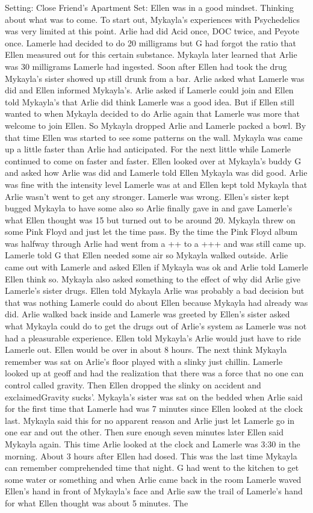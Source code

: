 \documentclass[12pt]{book}
\begin{document}
Setting: Close Friend's Apartment Set: Ellen was in a good mindset. Thinking about what was to come. To start out, Mykayla's experiences with Psychedelics was very limited at this point. Arlie had did Acid once, DOC twice, and Peyote once. Lamerle had decided to do 20 milligrams but G had forgot the ratio that Ellen measured out for this certain substance. Mykayla later learned that Arlie was 30 milligrams Lamerle had ingested. Soon after Ellen had took the drug Mykayla's sister showed up still drunk from a bar. Arlie asked what Lamerle was did and Ellen informed Mykayla's. Arlie asked if Lamerle could join and Ellen told Mykayla's that Arlie did think Lamerle was a good idea. But if Ellen still wanted to when Mykayla decided to do Arlie again that Lamerle was more that welcome to join Ellen. So Mykayla dropped Arlie and Lamerle packed a bowl. By that time Ellen was started to see some patterns on the wall. Mykayla was came up a little faster than Arlie had anticipated. For the next little while Lamerle continued to come on faster and faster. Ellen looked over at Mykayla's buddy G and asked how Arlie was did and Lamerle told Ellen Mykayla was did good. Arlie was fine with the intensity level Lamerle was at and Ellen kept told Mykayla that Arlie wasn't went to get any stronger. Lamerle was wrong. Ellen's sister kept bugged Mykayla to have some also so Arlie finally gave in and gave Lamerle's what Ellen thought was 15 but turned out to be around 20. Mykayla threw on some Pink Floyd and just let the time pass. By the time the Pink Floyd album was halfway through Arlie had went from a ++ to a +++ and was still came up. Lamerle told G that Ellen needed some air so Mykayla walked outside. Arlie came out with Lamerle and asked Ellen if Mykayla was ok and Arlie told Lamerle Ellen think so. Mykayla also asked something to the effect of why did Arlie give Lamerle's sister drugs. Ellen told Mykayla Arlie was probably a bad decision but that was nothing Lamerle could do about Ellen because Mykayla had already was did. Arlie walked back inside and Lamerle was greeted by Ellen's sister asked what Mykayla could do to get the drugs out of Arlie's system as Lamerle was not had a pleasurable experience. Ellen told Mykayla's Arlie would just have to ride Lamerle out. Ellen would be over in about 8 hours. The next think Mykayla remember was sat on Arlie's floor played with a slinky just chillin. Lamerle looked up at geoff and had the realization that there was a force that no one can control called gravity. Then Ellen dropped the slinky on accident and exclaimedGravity sucks'. Mykayla's sister was sat on the bedded when Arlie said for the first time that Lamerle had was 7 minutes since Ellen looked at the clock last. Mykayla said this for no apparent reason and Arlie just let Lamerle go in one ear and out the other. Then sure enough seven minutes later Ellen said Mykayla again. This time Arlie looked at the clock and Lamerle was 3:30 in the morning. About 3 hours after Ellen had dosed. This was the last time Mykayla can remember comprehended time that night. G had went to the kitchen to get some water or something and when Arlie came back in the room Lamerle waved Ellen's hand in front of Mykayla's face and Arlie saw the trail of Lamerle's hand for what Ellen thought was about 5 minutes. The 
\end{document}
